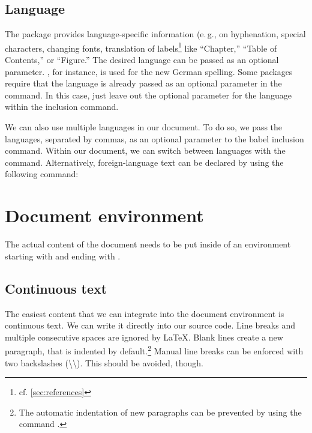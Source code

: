 \subsection{Language}\label{sec:language}
The package  provides language-specific information (e.\,g., on hyphenation, special characters, changing fonts, translation of labels\footnote{cf. \cref{sec:references}} like \enquote{Chapter,} \enquote{Table of Contents,} or \enquote{Figure.}
The desired language can be passed as an optional parameter. 
, for instance, is used for the new German spelling. 
Some packages require that the language is already passed as an optional parameter in the  command. 
In this case, just leave out the optional parameter for the language within the  inclusion command.

We can also use multiple languages in our document. 
To do so, we pass the languages, separated by commas, as an optional parameter to the babel inclusion command. 
Within our document, we can switch between languages with the  command. 
Alternatively, foreign-language text can be declared by using the following command: 


\section{Document environment}
The actual content of the  document needs to be put inside of an environment starting with  and ending with .

\subsection{Continuous text}
The easiest content that we can integrate into the document environment is continuous text. 
We can write it directly into our source code. 
Line breaks and multiple consecutive spaces are ignored by \LaTeX{}. 
Blank lines create a new paragraph, that is indented by default.\footnote{The automatic indentation of new paragraphs can be prevented by using the command .}
Manual line breaks can be enforced with two backslashes (\textbackslash\textbackslash). 
This should be avoided, though. 

